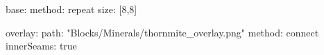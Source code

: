 base:
  method: repeat
  size: [8,8]

overlay:
  path: "Blocks/Minerals/thornmite_overlay.png"
  method: connect
  innerSeams: true